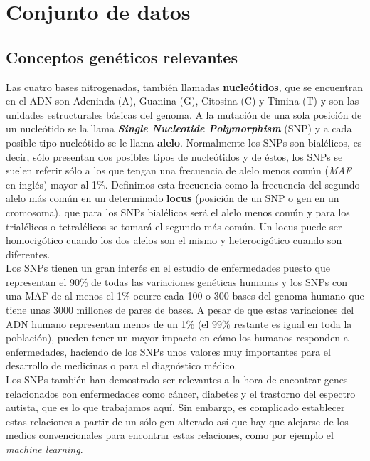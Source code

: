 
\chapter{Conjunto de datos}\label{ch:base-datos}

\section{Conceptos genéticos relevantes}\label{st:conceptos-geneticos}
Las cuatro bases nitrogenadas, también llamadas \textbf{nucleótidos}, que se encuentran en el ADN son Adeninda (A), Guanina (G), Citosina (C) y Timina (T) y son las unidades estructurales básicas del genoma. A la mutación de una sola posición de un nucleótido se la llama \textbf{\textit{Single Nucleotide Polymorphism}} (SNP) y a cada posible tipo nucleótido se le llama \textbf{alelo}. Normalmente los SNPs son bialélicos, es decir, sólo presentan dos posibles tipos de nucleótidos y de éstos, los SNPs se suelen referir sólo a los que tengan una frecuencia de alelo menos común (\textit{MAF} en inglés) mayor al 1\%. Definimos esta frecuencia como la frecuencia del segundo alelo más común en un determinado \textbf{locus} (posición de un SNP o gen en un cromosoma), que para los SNPs bialélicos será el alelo menos común y para los trialélicos o tetralélicos se tomará el segundo más común. Un locus puede ser homocigótico cuando los dos alelos son el mismo y heterocigótico cuando son diferentes. \cite{su2007single}\\
Los SNPs tienen un gran interés en el estudio de enfermedades puesto que representan el 90\% de todas las variaciones genéticas humanas y los SNPs con una MAF de al menos el 1\% ocurre cada 100 o 300 bases del genoma humano que tiene unas 3000 millones de pares de bases. A pesar de que estas variaciones del ADN humano representan menos de un 1\% (el 99\% restante es igual en toda la población), pueden tener un mayor impacto en cómo los humanos responden a enfermedades, haciendo de los SNPs unos valores muy importantes para el desarrollo de medicinas o para el diagnóstico médico. \cite{su2007single}\\
Los SNPs también han demostrado ser relevantes a la hora de encontrar genes relacionados con enfermedades como cáncer, diabetes y el trastorno del espectro autista, que es lo que trabajamos aquí. Sin embargo, es complicado establecer estas relaciones a partir de un sólo gen alterado así que hay que alejarse de los medios convencionales para encontrar estas relaciones, como por ejemplo el \textit{machine learning}. \cite{su2007single}\\\\
